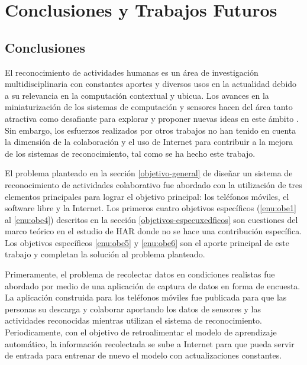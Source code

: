 
\chapter{Conclusiones y Trabajos Futuros}

\label{conclusiones-y-trabajos-futuros}

\section{Conclusiones}

\label{conclusiones}

El reconocimiento de actividades humanas es un área de investigación
multidisciplinaria con constantes aportes y diversos usos en la actualidad
debido a su relevancia en la computación contextual y ubicua. Los
avances en la miniaturización de los sistemas de computación y sensores
hacen del área tanto atractiva como desafiante para explorar y proponer
nuevas ideas en este ámbito \cite{LaraLabrador2013}. Sin embargo,
los esfuerzos realizados por otros trabajos no han tenido en cuenta
la dimensión de la colaboración y el uso de Internet para contribuir
a la mejora de los sistemas de reconocimiento, tal como se ha hecho
este trabajo.

El problema planteado en la sección \ref{objetivo-general} de diseñar
un sistema de reconocimiento de actividades colaborativo fue abordado
con la utilización de tres elementos principales para lograr el objetivo
principal: los teléfonos móviles, el software libre y la Internet.
Los primeros cuatro objetivos específicos (\ref{enu:obe1} al \ref{enu:obe4})
descritos en la sección \ref{objetivos-especuxedficos} son cuestiones
del marco teórico en el estudio de HAR donde no se hace una contribución
específica. Los objetivos específicos \ref{enu:obe5} y \ref{enu:obe6}
son el aporte principal de este trabajo y completan la solución al
problema planteado.

Primeramente, el problema de recolectar datos en condiciones realistas
fue abordado por medio de una aplicación de captura de datos en forma
de encuesta. La aplicación construida para los teléfonos móviles fue
publicada para que las personas su descarga y colaborar aportando
los datos de sensores y las actividades reconocidas mientras utilizan
el sistema de reconocimiento. Periodicamente, con el objetivo de retroalimentar
el modelo de aprendizaje automático, la información recolectada se
sube a Internet para que pueda servir de entrada para entrenar de
nuevo el modelo con actualizaciones constantes.


